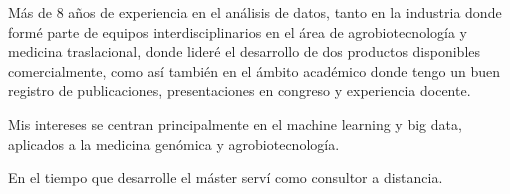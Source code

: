 \documentclass[10pt,a4paper,ragged2e]{altacv}
\begin{document}

\begin{fullwidth}
\makecvheader
\end{fullwidth}



Más de 8 años de experiencia en el análisis de datos, tanto en la industria donde formé parte de equipos interdisciplinarios en el área de agrobiotecnología y medicina traslacional, donde lideré el desarrollo de dos productos disponibles comercialmente,
como así también en el ámbito académico donde tengo un buen registro de publicaciones, presentaciones en congreso
y experiencia docente. 

Mis intereses se centran principalmente en el machine learning y big data, aplicados a la medicina genómica y agrobiotecnología.

\medskip


En el tiempo que desarrolle el máster serví como consultor a distancia.
\end{document}
